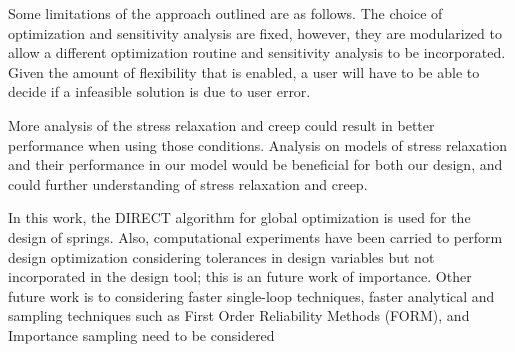 \documentclass[10pt]{article}
\begin{document}
Some limitations of the approach outlined are as follows. The choice of optimization and sensitivity analysis are fixed, however, they are modularized to allow a different optimization routine and sensitivity analysis to be incorporated. Given the amount of flexibility that is enabled, a user will have to be able to decide if a infeasible solution is due to user error. 

More analysis of the stress relaxation and creep could result in better performance when using those conditions. Analysis on models of stress relaxation and their performance in our model would be beneficial for both our design, and could further understanding of stress relaxation and creep.

In this work, the DIRECT algorithm for global optimization is used for the design of springs. Also, computational experiments have been carried to perform design optimization considering tolerances in design variables but not incorporated in the design tool; this is an future work of importance. Other future work is to considering faster single-loop techniques, faster analytical and sampling techniques such as First Order Reliability Methods (FORM), and Importance sampling need to be considered


%
\end{document}
